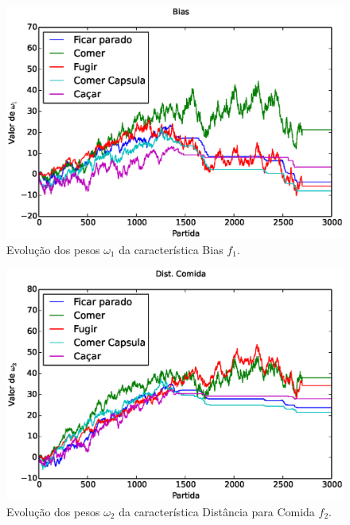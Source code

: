 \begin{figure}[H]
    \centering
    \includegraphics[width=\linewidth]{images/5_behaviors_small_map/weights____pol__Bias}
    \caption{Evolução dos pesos $ \omega_1 $ da característica Bias $ f_1 $.}
    \label{img:5ComportamentosMapaPequeno:PesoBias}
\end{figure}

\begin{figure}[H]
    \centering
    \includegraphics[width=\linewidth]{images/5_behaviors_small_map/weights____pol__DistComida}
    \caption{Evolução dos pesos $ \omega_2 $ da característica Distância para Comida $ f_2 $.}
    \label{img:5ComportamentosMapaPequeno:PesoDistComida}
\end{figure}

